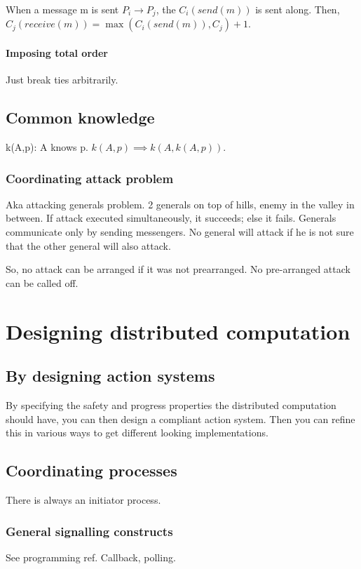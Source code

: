 \documentclass[oneside, article]{memoir}
\begin{document}
When a message m is sent $P_{i} \to P_{j}$, the $C_{i}(send(m))$ is sent along. Then, $C_{j}(receive(m)) = \max(C_{i}(send(m)), C_{j}) + 1$.

\subsubsection{Imposing total order}
Just break ties arbitrarily.


\section{Common knowledge}
k(A,p): A knows p. $k(A,p) \implies k(A, k(A,p))$.

\subsection{Coordinating attack problem}
Aka attacking generals problem. 2 generals on top of hills, enemy in the valley in between. If attack executed simultaneously, it succeeds; else it fails. Generals communicate only by sending messengers. No general will attack if he is not sure that the other general will also attack.

So, no attack can be arranged if it was not prearranged. No pre-arranged attack can be called off.

\chapter{Designing distributed computation}
\section{By designing action systems}
By specifying the safety and progress properties the distributed computation should have, you can then design a compliant action system. Then you can refine this in various ways to get different looking implementations.

\section{Coordinating processes}
There is always an initiator process.

\subsection{General signalling constructs}
See programming ref. Callback, polling.
\end{document}
